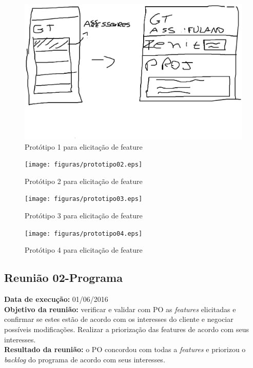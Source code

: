 \begin{figure}[H]
    \centering
    \includegraphics[keepaspectratio=true,scale=0.3]{figuras/prototipo01.eps}
    \caption[Prototipo 1 de feature]{Protótipo 1 para elicitação de feature\label{prototipo01}}
\end{figure}
\begin{figure}[H]
    \centering
    \texttt{[image: figuras/prototipo02.eps]}
    \caption[Prototipo 2 de feature]{Protótipo 2 para elicitação de feature\label{prototipo02}}
\end{figure}
\begin{figure}[H]
    \centering
    \texttt{[image: figuras/prototipo03.eps]}
    \caption[Prototipo 3 de feature]{Protótipo 3 para elicitação de feature\label{prototipo03}}
\end{figure}

\begin{figure}[H]
    \centering
    \texttt{[image: figuras/prototipo04.eps]}
    \caption[Prototipo 4 de feature]{Protótipo 4 para elicitação de feature\label{prototipo04}}
\end{figure}

\subsection{Reunião 02-Programa}

    \indent \textbf{Data de execução:} 01/06/2016\\
    \indent \textbf{Objetivo da reunião:} verificar e validar com PO as \textit{features} elicitadas e confirmar se estes estão de acordo com os interesses do cliente e negociar possíveis modificações. Realizar a priorização das features de acordo com seus interesses.\\
    \indent \textbf{Resultado da reunião:} o PO concordou com todas a \textit{features} e priorizou o \textit{backlog} do programa de acordo com seus interesses.\\

